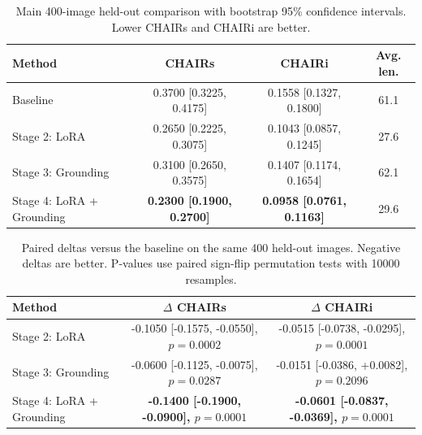 
\begin{table}[t]
\centering
\small
\caption{Main 400-image held-out comparison with bootstrap 95\% confidence intervals. Lower CHAIRs and CHAIRi are better.}
\label{tab:main_bootstrap}
\begin{tabular}{lccc}
\toprule
Method & CHAIRs & CHAIRi & Avg. len. \\
\midrule
Baseline & 0.3700 [0.3225, 0.4175] & 0.1558 [0.1327, 0.1800] & 61.1 \\
Stage 2: LoRA & 0.2650 [0.2225, 0.3075] & 0.1043 [0.0857, 0.1245] & 27.6 \\
Stage 3: Grounding & 0.3100 [0.2650, 0.3575] & 0.1407 [0.1174, 0.1654] & 62.1 \\
Stage 4: LoRA + Grounding & \textbf{0.2300 [0.1900, 0.2700]} & \textbf{0.0958 [0.0761, 0.1163]} & 29.6 \\
\bottomrule
\end{tabular}
\end{table}

\begin{table}[t]
\centering
\small
\caption{Paired deltas versus the baseline on the same 400 held-out images. Negative deltas are better. P-values use paired sign-flip permutation tests with 10000 resamples.}
\label{tab:main_paired_deltas}
\begin{tabular}{lcc}
\toprule
Method & $\Delta$ CHAIRs & $\Delta$ CHAIRi \\
\midrule
Stage 2: LoRA & -0.1050 [-0.1575, -0.0550], $p=0.0002$ & -0.0515 [-0.0738, -0.0295], $p=0.0001$ \\
Stage 3: Grounding & -0.0600 [-0.1125, -0.0075], $p=0.0287$ & -0.0151 [-0.0386, +0.0082], $p=0.2096$ \\
Stage 4: LoRA + Grounding & \textbf{-0.1400 [-0.1900, -0.0900], $p=0.0001$} & \textbf{-0.0601 [-0.0837, -0.0369], $p=0.0001$} \\
\bottomrule
\end{tabular}
\end{table}

